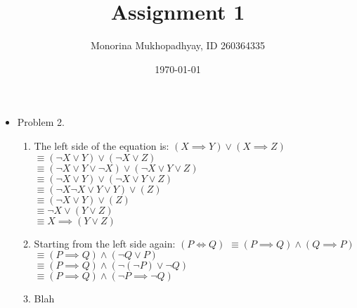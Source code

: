 \documentclass{article}
\begin{document}
 \title{Assignment 1} 

\author{Monorina Mukhopadhyay, ID 260364335} 

\date{\today}

\maketitle

\begin{itemize}

\item Problem 2.
\begin{enumerate} [label=\alph*]
%
\item The left side of the equation is: 
    $ \left(X \implies Y \right) \lor \left( X \implies Z \right)$ \\
    $ \equiv ( \lnot X \lor Y ) \lor (\lnot X \lor Z)$    \\
    $ \equiv ( \lnot X \lor Y \lor \lnot X ) \lor (\lnot X \lor Y \lor Z)$   \\
    $ \equiv ( \lnot X \lor Y) \lor ( \lnot X \lor Y \lor Z)$    \\
    $ \equiv ( \lnot X \lnot X \lor Y \lor Y) \lor (Z)$    \\
    $ \equiv ( \lnot X \lor Y ) \lor ( Z) $   \\
    $ \equiv  \lnot X \lor ( Y \lor Z ) $   \\
    $ \equiv X \implies (Y \lor Z ) $   \\
\item Starting from the left side again:
	$ ( P \iff Q) $
	$ \equiv (P \implies Q ) \land (Q \implies P ) $  \\
	$ \equiv (P \implies Q ) \land (\lnot Q \lor P) $  \\
	$ \equiv (P \implies Q ) \land (\lnot (\lnot P) \lor \lnot Q ) $  \\
	$ \equiv (P \implies Q ) \land (\lnot P \implies \lnot Q) $  \\
\item Blah



\end{enumerate}
\end{itemize}
\end{document}
